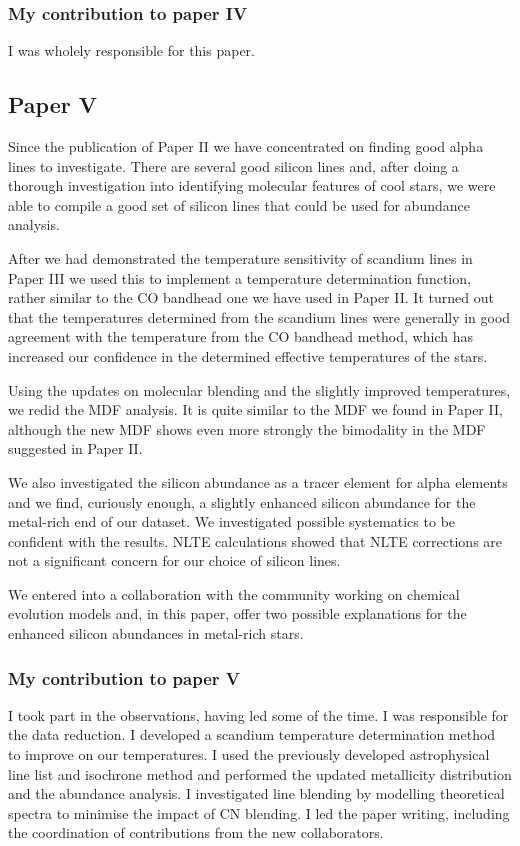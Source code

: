 \subsubsection*{My contribution to paper IV}

I was wholely responsible for this paper.


\subsection*{Paper V}

Since the publication of Paper II we have concentrated on finding good alpha lines to investigate. There are several good silicon lines and, after doing a thorough investigation into identifying molecular features of cool stars, we were able to compile a good set of silicon lines that could be used for abundance analysis.

After we had demonstrated the temperature sensitivity of scandium lines in Paper III we used this to implement a temperature determination function, rather similar to the CO bandhead one we have used in Paper II. It turned out that the temperatures determined from the scandium lines were generally in good agreement with the temperature from the CO bandhead method, which has increased our confidence in the determined effective temperatures of the stars.

Using the updates on molecular blending and the slightly improved temperatures, we redid the MDF analysis. It is quite similar to the MDF we found in Paper II, although the new MDF shows even more strongly the bimodality in the MDF suggested in Paper II.

We also investigated the silicon abundance as a tracer element for alpha elements and we find, curiously enough, a slightly enhanced silicon abundance for the metal-rich end of our dataset. We investigated possible systematics to be confident with the results. NLTE calculations showed that NLTE corrections are not a significant concern for our choice of silicon lines.

We entered into a collaboration with the community working on chemical evolution models and, in this paper, offer two possible explanations for the enhanced silicon abundances in metal-rich stars.


\subsubsection*{My contribution to paper V}

I took part in the observations, having led some of the time. I was responsible for the data reduction. I developed a scandium temperature determination method to improve on our temperatures. I used the previously developed astrophysical line list and isochrone method and performed the updated metallicity distribution and the abundance analysis. I investigated line blending by modelling theoretical spectra to minimise the impact of CN blending. I led the paper writing, including the coordination of contributions from the new collaborators.

